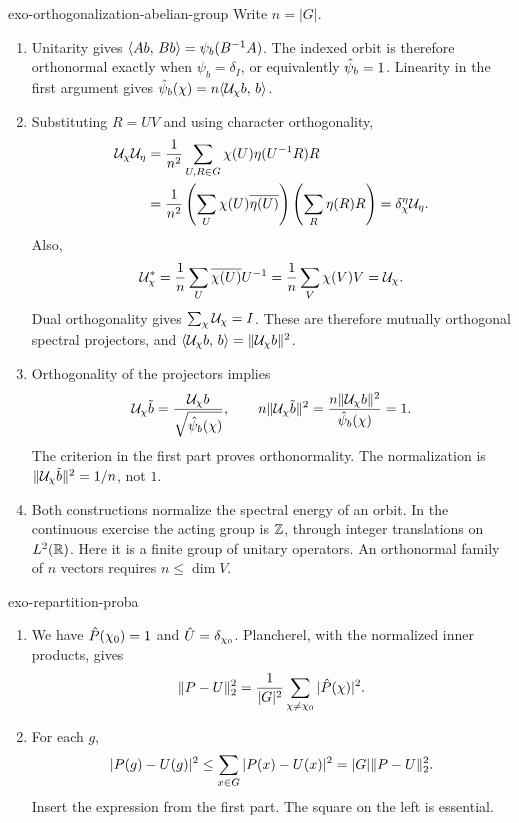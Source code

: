 \begin{correction}{exo-orthogonalization-abelian-group}
Write $n=|G|$.
\begin{enumerate}
\item Unitarity gives $\langle Ab,\,Bb\rangle=\psi_b(B^{-1}A)$.
The indexed orbit is therefore orthonormal exactly when $\psi_b=\delta_I$,
or equivalently $\hat{\psi}_b=1$. Linearity in the first argument gives
$\hat{\psi}_b(\chi)=n\langle \mathcal{U}_\chi b,\,b\rangle$.
\item Substituting $R=UV$ and using character orthogonality,
\begin{align*}
 \mathcal{U}_\chi\mathcal{U}_\eta
 &=\frac1{n^2}\sum_{U,R\in G}\chi(U)\eta(U^{-1}R)R\\
 &=\frac1{n^2}\left(\sum_U\chi(U)\overline{\eta(U)}\right)
                     \left(\sum_R\eta(R)R\right)
 =\delta_\chi^\eta\mathcal{U}_\eta.
\end{align*}
Also,
\[
 \mathcal{U}_\chi^*=\frac1n\sum_U\overline{\chi(U)}U^{-1}
 =\frac1n\sum_V\chi(V)V=\mathcal{U}_\chi.
\]
Dual orthogonality gives $\sum_\chi\mathcal{U}_\chi=I$. These are therefore mutually
orthogonal spectral projectors, and
$\langle \mathcal{U}_\chi b,\,b\rangle=\lVert\mathcal{U}_\chi b\rVert^2$.
\item Orthogonality of the projectors implies
\[
 \mathcal{U}_\chi\tilde{b}=\frac{\mathcal{U}_\chi b}{\sqrt{\hat{\psi}_b(\chi)}},
 \qquad
 n\lVert\mathcal{U}_\chi\tilde{b}\rVert^2
 =\frac{n\lVert\mathcal{U}_\chi b\rVert^2}{\hat{\psi}_b(\chi)}=1.
\]
The criterion in the first part proves orthonormality. The normalization is
$\lVert\mathcal{U}_\chi\tilde{b}\rVert^2=1/n$, not $1$.
\item Both constructions normalize the spectral energy of an orbit. In the
continuous exercise the acting group is $\mathbb{Z}$, through integer translations
on $L^2(\mathbb{R})$. Here it is a finite group of unitary operators.
An orthonormal family of $n$ vectors requires $n\leq\dim V$.
\end{enumerate}
\end{correction}

\begin{correction}{exo-repartition-proba}
\begin{enumerate}
\item We have $\hat{P}(\chi_0)=1$ and $\hat{U}=\delta_{\chi_0}$.
Plancherel, with the normalized inner products, gives
\[
 \lVert P-U\rVert_2^2=\frac1{|G|^2}
                 \sum_{\chi\neq\chi_0}|\hat{P}(\chi)|^2.
\]
\item For each $g$,
\[
 |P(g)-U(g)|^2\leq\sum_{x\in G}|P(x)-U(x)|^2
 =|G|\lVert P-U\rVert_2^2.
\]
Insert the expression from the first part. The square on the left is
essential.
\end{enumerate}
\end{correction}

